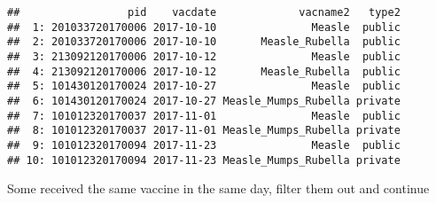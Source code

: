 \documentclass[
]{article}
\newenvironment{Shaded}{\begin{snugshade}}{\end{snugshade}}
\newcommand{\AttributeTok}[1]{\textcolor[rgb]{0.77,0.63,0.00}{#1}}
\newcommand{\CommentTok}[1]{\textcolor[rgb]{0.56,0.35,0.01}{\textit{#1}}}
\newcommand{\DecValTok}[1]{\textcolor[rgb]{0.00,0.00,0.81}{#1}}
\newcommand{\FunctionTok}[1]{\textcolor[rgb]{0.00,0.00,0.00}{#1}}
\newcommand{\NormalTok}[1]{#1}
\newcommand{\OtherTok}[1]{\textcolor[rgb]{0.56,0.35,0.01}{#1}}
\newcommand{\SpecialCharTok}[1]{\textcolor[rgb]{0.00,0.00,0.00}{#1}}
\begin{document}
\begin{verbatim}
##                 pid    vacdate             vacname2   type2
##  1: 201033720170006 2017-10-10               Measle  public
##  2: 201033720170006 2017-10-10       Measle_Rubella  public
##  3: 213092120170006 2017-10-12               Measle  public
##  4: 213092120170006 2017-10-12       Measle_Rubella  public
##  5: 101430120170024 2017-10-27               Measle  public
##  6: 101430120170024 2017-10-27 Measle_Mumps_Rubella private
##  7: 101012320170037 2017-11-01               Measle  public
##  8: 101012320170037 2017-11-01 Measle_Mumps_Rubella private
##  9: 101012320170094 2017-11-23               Measle  public
## 10: 101012320170094 2017-11-23 Measle_Mumps_Rubella private
\end{verbatim}

Some received the same vaccine in the same day, filter them out and
continue

\begin{Shaded}
\end{Shaded}
\end{document}
